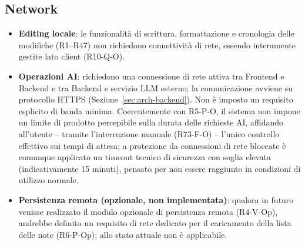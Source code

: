 \subsection{Network}
\begin{itemize}
	\item \textbf{Editing locale}: le funzionalità di scrittura, formattazione e cronologia delle modifiche (R1--R47) non richiedono connettività di rete, essendo interamente gestite lato client (R10-Q-O).
	\item \textbf{Operazioni AI}: richiedono una connessione di rete attiva tra Frontend e Backend e tra Backend e servizio LLM esterno; la comunicazione avviene su protocollo HTTPS (Sezione~\ref{sec:arch-backend}). Non è imposto un requisito esplicito di banda minima. Coerentemente con R5-P-O, il sistema non impone un limite di prodotto percepibile sulla durata delle richieste AI, affidando all'utente -- tramite l'interruzione manuale (R73-F-O) -- l'unico controllo effettivo sui tempi di attesa; a protezione da connessioni di rete bloccate è comunque applicato un timeout tecnico di sicurezza con soglia elevata (indicativamente 15 minuti), pensato per non essere raggiunto in condizioni di utilizzo normale.
	\item \textbf{Persistenza remota (opzionale, non implementata)}: qualora in futuro venisse realizzato il modulo opzionale di persistenza remota (R4-V-Op), andrebbe definito un requisito di rete dedicato per il caricamento della lista delle note (R6-P-Op); allo stato attuale non è applicabile.
\end{itemize}

\FloatBarrier
